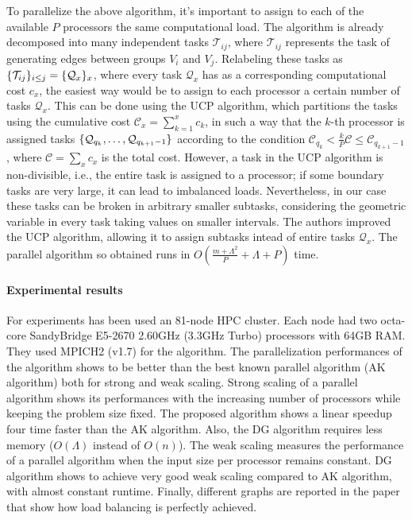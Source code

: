 \documentclass[a4paper,11pt]{article}
\theoremstyle{definition}
\theoremstyle{plain}
\theoremstyle{remark}
\DeclarePairedDelimiter{\bra}{\lbrace}{\rbrace}
\begin{document}
To parallelize the above algorithm, it's important to assign to each of the available $P$ processors the same computational load. The algorithm is already decomposed into many independent tasks $\mathcal{T}_{ij}$, where $\mathcal{T}_{ij}$ represents the task of generating edges between groups $V_i$ and $V_j$.
Relabeling these tasks as $\bra{\mathcal{T}_{ij}}_{i\leq j} = \bra{\mathcal{Q}_x}_x$, where every task $\mathcal{Q}_x$ has as a corresponding computational cost $c_x$, the easiest way would be to assign to each processor a certain number of tasks $\mathcal{Q}_x$. This can be done using the UCP algorithm, which partitions the tasks using the cumulative cost $\mathcal{C}_x=\sum_{k=1}^xc_k$, in such a way that the $k$-th processor is assigned tasks $\bra{\mathcal{Q}_{q_k},\dots,\mathcal{Q}_{q_{k+1}-1}}$ according to the condition $\mathcal{C}_{q_k}< \frac{k}{P}\mathcal{C}\leq\mathcal{C}_{q_{k+1}-1}$, where $\mathcal{C}=\sum_xc_x$ is the total cost. However, a task in the UCP algorithm is non-divisible, i.e., the entire task is assigned to a processor; if some boundary tasks are very large, it can lead to imbalanced loads. Nevertheless, in our case these tasks can be broken in arbitrary smaller subtasks, considering the geometric variable in every task taking values on smaller intervals. The authors improved the UCP algorithm, allowing it to assign subtasks intead of entire tasks $\mathcal{Q}_x$. The parallel algorithm so obtained runs in $O(\frac{m+\Lambda^2}{P}+\Lambda+P)$ time.

\paragraph*{Experimental results}

For experiments has been used an 81-node HPC cluster. Each node had two octa-core SandyBridge E5-2670 2.60GHz (3.3GHz Turbo) processors with 64GB RAM. They used MPICH2 (v1.7) for the algorithm.
The parallelization performances of the algorithm shows to be better than the best known parallel algorithm (AK algorithm) both for strong and weak scaling.
Strong scaling of a parallel algorithm shows its performances with the increasing number of processors while keeping the problem size fixed. The proposed algorithm  shows a linear speedup four time faster than the AK algorithm. Also, the DG algorithm requires less memory ($O(\Lambda)$ instead of $O(n)$).
The weak scaling measures the performance of a parallel algorithm when the input size per processor remains constant. DG algorithm shows to achieve very good weak scaling compared to AK algorithm, with almost constant runtime.
Finally, different graphs are reported in the paper that show how load balancing is perfectly achieved.   
\end{document}
